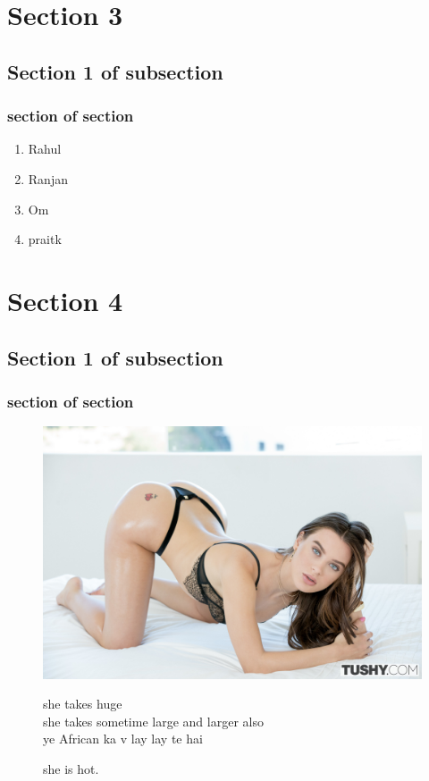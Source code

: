 \documentclass[a4paper,12pt]{article}
\begin{document}
\section{Section 3}
\subsection{Section 1 of subsection}
\subsubsection{section of section}
\begin{enumerate}
    \item Rahul
    \item Ranjan
    \item Om
    \item praitk
\end{enumerate}
\newpage
\section{Section 4}
\subsection{Section 1 of subsection}
\subsubsection{section of section}
\centering
\begin{figure}[h]
    \includegraphics[width=1\textwidth]{Lana-Rhoades-model-women-blue-eyes-Tushy-com-1228818-wallhere.com.jpg}
    \caption{she is hot.}
    \huge{she takes huge}\\
    \large{she takes sometime large}
    \LARGE{and larger also}\\
    \Huge{ye African ka v lay lay te hai}
\end{figure}
\end{document}

